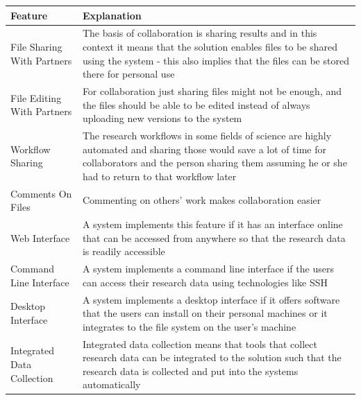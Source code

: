 \label{table:management_features}
    \begin{tabularx}{\textwidth}{| >{\raggedright}p{3cm} | X |}
    \hline
    \textbf{Feature} & \textbf{Explanation} \\
    \hline
    \rowcolor{Gray}
    File Sharing With Partners    & The basis of collaboration is sharing results and in this
                                    context it means that the solution enables files to be
                                    shared using the system - this also implies that the files
                                    can be stored there for personal use\\
    \hline
    File Editing With Partners & For collaboration just sharing files might not be enough, and
                                 the files should be able to be edited instead of always uploading
                                 new versions to the system\\
    \hline
    \rowcolor{Gray}
    Workflow Sharing    &  The research workflows in some fields of science are highly automated
                           and sharing those would save a lot of time for collaborators and the person
                           sharing them assuming he or she had to return to that workflow later\\
    \hline
    Comments On Files    & Commenting on others' work makes collaboration easier\\
    \hline
    \rowcolor{Gray}
    Web Interface          & A system implements this feature if it has an interface online that
                             can be accessed from anywhere so that the research data is readily
                             accessible\\
    \hline
    Command Line Interface    & A system implements a command line interface if the users can access
                                their research data using technologies like SSH\\
    \hline
    \rowcolor{Gray}
    Desktop Interface       & A system implements a desktop interface if it offers software that the
                              users can install on their personal machines or it integrates to the
                              file system on the user's machine\\
    \hline
    Integrated Data Collection    & Integrated data collection means that tools that collect research
                                    data can be integrated to the solution such that the research data
                                    is collected and put into the systems automatically\\
    \hline
\end{tabularx}

